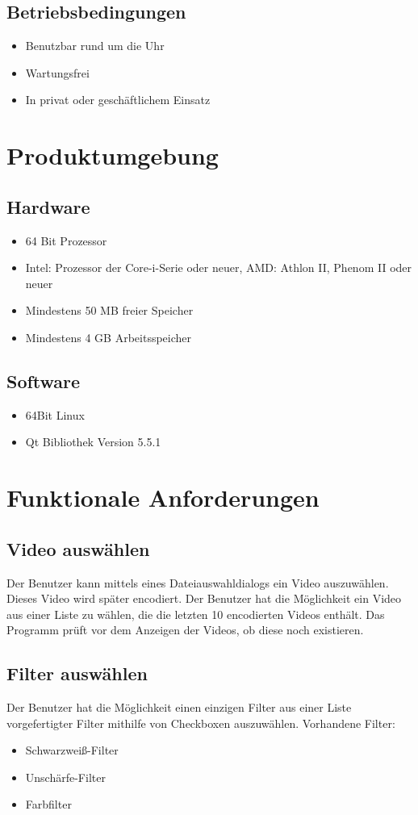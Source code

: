 \documentclass[parskip=full]{scrartcl}
\begin{document}
\subsection{Betriebsbedingungen}
\begin{itemize}
\item Benutzbar rund um die Uhr
\item Wartungsfrei
\item In privat oder geschäftlichem Einsatz
\end{itemize}
\newpage
\section{Produktumgebung}

\subsection{Hardware}
\begin{itemize}
\item 64 Bit Prozessor
\item Intel: Prozessor der Core-i-Serie oder neuer, AMD: Athlon II, Phenom II oder neuer
\item Mindestens 50 MB freier Speicher
\item Mindestens 4 GB Arbeitsspeicher
\end{itemize}
\subsection{Software}
\begin{itemize}
\item 64Bit Linux
\item Qt Bibliothek Version 5.5.1
\end{itemize}
\newpage
\section{Funktionale Anforderungen}
\subsection{Video auswählen}
Der Benutzer kann mittels eines Dateiauswahldialogs ein Video auszuwählen. Dieses
Video wird später encodiert. Der Benutzer hat die Möglichkeit ein Video aus einer Liste zu wählen, die die letzten 10 encodierten
Videos enthält. Das Programm prüft vor dem Anzeigen der Videos, ob diese noch existieren.
\subsection{Filter auswählen}
Der Benutzer hat die Möglichkeit einen einzigen Filter aus einer Liste vorgefertigter Filter mithilfe von Checkboxen auszuwählen. Vorhandene Filter:
\begin{itemize}
\item Schwarzweiß-Filter
\item Unschärfe-Filter
\item Farbfilter
\end{itemize}
\end{document}
